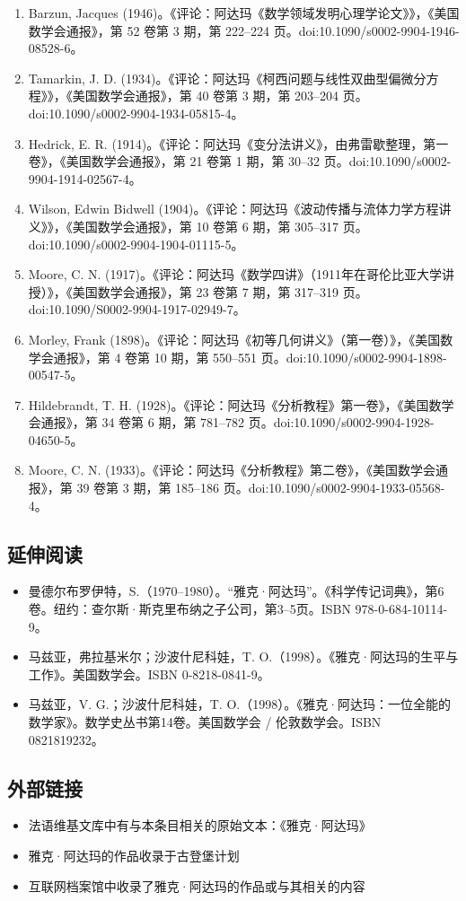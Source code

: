 \begin{enumerate}
\item Barzun, Jacques (1946)。《评论：阿达玛《数学领域发明心理学论文》》，《美国数学会通报》，第 52 卷第 3 期，第 222–224 页。doi:10.1090/s0002-9904-1946-08528-6。
\item Tamarkin, J. D. (1934)。《评论：阿达玛《柯西问题与线性双曲型偏微分方程》》，《美国数学会通报》，第 40 卷第 3 期，第 203–204 页。doi:10.1090/s0002-9904-1934-05815-4。
\item Hedrick, E. R. (1914)。《评论：阿达玛《变分法讲义》，由弗雷歇整理，第一卷》，《美国数学会通报》，第 21 卷第 1 期，第 30–32 页。doi:10.1090/s0002-9904-1914-02567-4。
\item Wilson, Edwin Bidwell (1904)。《评论：阿达玛《波动传播与流体力学方程讲义》》，《美国数学会通报》，第 10 卷第 6 期，第 305–317 页。doi:10.1090/s0002-9904-1904-01115-5。
\item Moore, C. N. (1917)。《评论：阿达玛《数学四讲》（1911年在哥伦比亚大学讲授）》，《美国数学会通报》，第 23 卷第 7 期，第 317–319 页。doi:10.1090/S0002-9904-1917-02949-7。
\item Morley, Frank (1898)。《评论：阿达玛《初等几何讲义》（第一卷）》，《美国数学会通报》，第 4 卷第 10 期，第 550–551 页。doi:10.1090/s0002-9904-1898-00547-5。
\item Hildebrandt, T. H. (1928)。《评论：阿达玛《分析教程》第一卷》，《美国数学会通报》，第 34 卷第 6 期，第 781–782 页。doi:10.1090/s0002-9904-1928-04650-5。
\item Moore, C. N. (1933)。《评论：阿达玛《分析教程》第二卷》，《美国数学会通报》，第 39 卷第 3 期，第 185–186 页。doi:10.1090/s0002-9904-1933-05568-4。
\end{enumerate}
\subsection{延伸阅读}
\begin{itemize}
\item 曼德尔布罗伊特，S.（1970–1980）。“雅克·阿达玛”。《科学传记词典》，第6卷。纽约：查尔斯·斯克里布纳之子公司，第3–5页。ISBN 978-0-684-10114-9。
\item 马兹亚，弗拉基米尔；沙波什尼科娃，T. O.（1998）。《雅克·阿达玛的生平与工作》。美国数学会。ISBN 0-8218-0841-9。
\item 马兹亚，V. G.；沙波什尼科娃，T. O.（1998）。《雅克·阿达玛：一位全能的数学家》。数学史丛书第14卷。美国数学会 / 伦敦数学会。ISBN 0821819232。
\end{itemize}
\subsection{外部链接}
\begin{itemize}
\item 法语维基文库中有与本条目相关的原始文本：《雅克·阿达玛》
\item 雅克·阿达玛的作品收录于古登堡计划
\item 互联网档案馆中收录了雅克·阿达玛的作品或与其相关的内容
\end{itemize}

